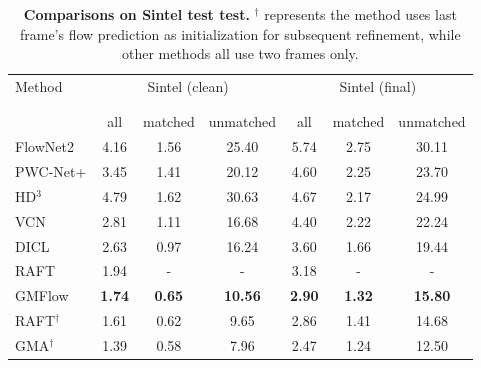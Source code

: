 \documentclass[10pt,twocolumn,letterpaper]{article}
\begin{document}
\begin{table}[t]
\footnotesize
    \centering
    \setlength{\tabcolsep}{2pt} \begin{tabular}{lcccccc}
    \toprule
    \multirow{2}{*}[-2pt]{Method } & \multicolumn{3}{c}{Sintel (clean)} &
    \multicolumn{3}{c}{Sintel (final)} \\
    \addlinespace[-12pt]  \\
    \cmidrule(lr){2-4} \cmidrule(lr){5-7} 
    \addlinespace[-12pt] \\
    & all & matched & unmatched & all & matched & unmatched \\
    \midrule
    
    FlowNet2 \cite{ilg2017flownet} & 4.16 & 1.56 & 25.40 & 5.74 & 2.75 & 30.11 \\
    PWC-Net+ \cite{sun2019models} & 3.45 & 1.41 & 20.12 & 4.60 & 2.25 & 23.70  \\
    HD$^3$ \cite{yin2019hierarchical} & 4.79 & 1.62 & 30.63 & 4.67 & 2.17 & 24.99 \\
    VCN \cite{yang2019volumetric} & 2.81 & 1.11 & 16.68 & 4.40 & 2.22 & 22.24 \\
    DICL \cite{wang2020displacement} & 2.63 & 0.97 & 16.24 & 3.60 & 1.66 & 19.44 \\
    
    RAFT \cite{teed2020raft} & 1.94 & - & - & 3.18 & - & - \\
    GMFlow & \textbf{1.74} & \textbf{0.65} & \textbf{10.56} & \textbf{2.90} & \textbf{1.32} & \textbf{15.80} \\
    
    \midrule
    
    RAFT$^\dagger$ \cite{teed2020raft} & 1.61 & 0.62 & 9.65 & 2.86 & 1.41 & 14.68 \\
    GMA$^\dagger$ \cite{Jiang_2021_ICCV} & 1.39 & 0.58 & 7.96 & 2.47 & 1.24 & 12.50 \\
    

    \bottomrule
    \end{tabular}
    \vspace{-8pt}
    \caption{\textbf{Comparisons on Sintel test test.} $^\dagger$ represents the method uses last frame's flow prediction as initialization for subsequent refinement, while other methods all use two frames only.}
    \vspace{-16pt}
    \label{tab:sintel_compare}
\end{table}
\end{document}
